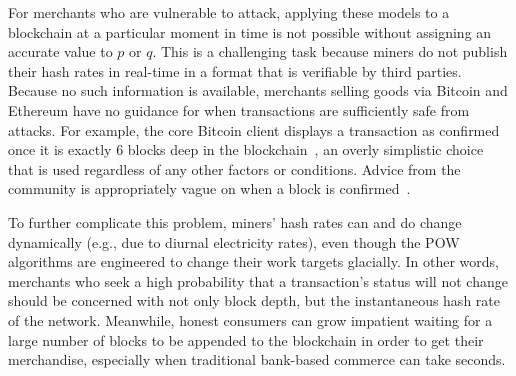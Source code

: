 \documentclass[10pt,sigconf]{acmart}
\newcommand{\1}{{\em (i)}}
\newcommand{\2}{{\em (ii)}}
\newcommand{\3}{{\em (iii)}}
\newcommand{\4}{{\em (iv)}}
\newcommand{\5}{{\em (v)}}
\begin{document}
For merchants who are vulnerable to attack, applying
these models to a blockchain at a particular moment in time is not
possible without assigning an accurate value to $p$ or $q$. This is 
a challenging task because miners do not publish their hash rates in
real-time in a format that is verifiable by third parties. Because
no such information is available, merchants selling goods via Bitcoin
and Ethereum have no guidance for when transactions are sufficiently
safe from attacks. For example, the core Bitcoin client displays a
transaction as confirmed once it is exactly $6$ blocks deep in the
blockchain~\cite{bitcoin:confirmation}, an overly simplistic choice
that is used regardless of any other factors or conditions. Advice
from the community is appropriately vague on when a block is confirmed~\cite{Bonneau:2015a}.

To further complicate this problem, miners' hash rates can and do
change dynamically (e.g., due to diurnal electricity rates), even though the POW
algorithms are engineered to change their work targets glacially. In
other words, merchants who seek a high probability that a
transaction's status will not change should be concerned with not only
block depth, but the instantaneous hash rate of the network. Meanwhile,
honest consumers can grow impatient waiting for a large number of blocks to be appended to the blockchain
in order to get their merchandise, especially when traditional bank-based commerce
can take seconds.
\end{document}
